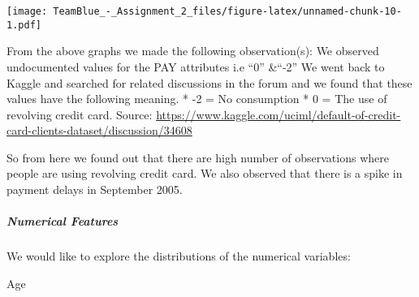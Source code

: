 \documentclass[]{article}
\newenvironment{Shaded}{\begin{snugshade}}{\end{snugshade}}
\newcommand{\KeywordTok}[1]{\textcolor[rgb]{0.13,0.29,0.53}{\textbf{#1}}}
\newcommand{\DataTypeTok}[1]{\textcolor[rgb]{0.13,0.29,0.53}{#1}}
\newcommand{\DecValTok}[1]{\textcolor[rgb]{0.00,0.00,0.81}{#1}}
\newcommand{\StringTok}[1]{\textcolor[rgb]{0.31,0.60,0.02}{#1}}
\newcommand{\OperatorTok}[1]{\textcolor[rgb]{0.81,0.36,0.00}{\textbf{#1}}}
\newcommand{\NormalTok}[1]{#1}
\let\oldsubparagraph\subparagraph
\renewcommand{\subparagraph}[1]{\oldsubparagraph{#1}\mbox{}}
\begin{document}
\begin{Shaded}
\end{Shaded}

\texttt{[image: TeamBlue\_-\_Assignment\_2\_files/figure-latex/unnamed-chunk-10-1.pdf]}

From the above graphs we made the following observation(s): We observed
undocumented values for the PAY attributes i.e ``0'' \&``-2'' We went
back to Kaggle and searched for related discussions in the forum and we
found that these values have the following meaning. * -2 = No
consumption * 0 = The use of revolving credit card. Source:
\url{https://www.kaggle.com/uciml/default-of-credit-card-clients-dataset/discussion/34608}

So from here we found out that there are high number of observations
where people are using revolving credit card. We also observed that
there is a spike in payment delays in September 2005.

\subparagraph{Numerical Features}\label{numerical-features}

We would like to explore the distributions of the numerical variables:

Age
\end{document}
